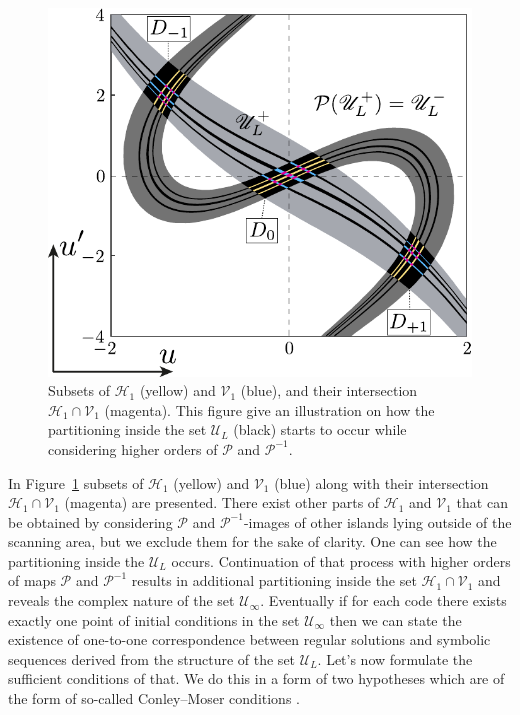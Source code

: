 \begin{figure}[h]
\centering
	\includegraphics[scale = 1]{pic/h- and v-strips for piecewise equation}
	\caption{
		Subsets of $\mathscr{H}_1$ (yellow) and $\mathscr{V}_1$ (blue), and their intersection $\mathscr{H}_1 \cap \mathscr{V}_1$ (magenta).
		This figure give an illustration on how the partitioning inside the set $\mathscr{U}_L$ (black) starts to occur while considering higher orders of $\mathcal{P}$ and $\mathcal{P}^{-1}$.
	}
\label{fig:hv-strips-piecewise}
\end{figure}

In Figure~\ref{fig:hv-strips-piecewise} subsets of $\mathscr{H}_1$ (yellow) and $\mathscr{V}_1$ (blue) along with their intersection $\mathscr{H}_1 \cap \mathscr{V}_1$ (magenta) are presented.
There exist other parts of $\mathscr{H}_1$ and $\mathscr{V}_1$ that can be obtained by considering $\mathcal{P}$ and $\mathcal{P}^{-1}$-images of other islands lying outside of the scanning area, but we exclude them for the sake of clarity.
One can see how the partitioning inside the $\mathscr{U}_L$ occurs.
Continuation of that process with higher orders of maps $\mathcal{P}$ and $\mathcal{P}^{-1}$ results in additional partitioning inside the set $\mathscr{H}_1 \cap \mathscr{V}_1$ and reveals the complex nature of the set $\mathscr{U}_{\infty}$.
Eventually if for each code there exists exactly one point of initial conditions in the set $\mathscr{U}_{\infty}$ then we can state the existence of one-to-one correspondence between regular solutions and symbolic sequences derived from the structure of the set $\mathscr{U}_L$.
Let's now formulate the sufficient conditions of that.
We do this in a form of two hypotheses which are of the form of so-called Conley--Moser conditions \cite[Chapter 25]{Wiggins}.

